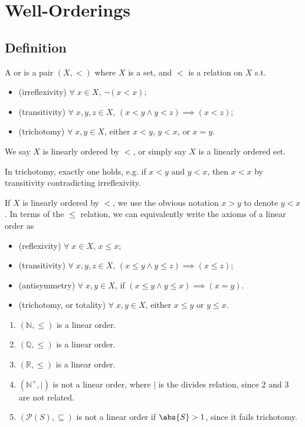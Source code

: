 \section{Well-Orderings}
\subsection{Definition}

\begin{definition}
    A  or  is a pair $(X, <)$ where $X$ is a set, and $<$ is a relation on $X$ s.t.
    \begin{itemize}
        \item (irreflexivity) $\forall \; x \in X$, $\neg(x < x)$;
        \item (transitivity) $\forall \; x, y, z \in X$, $(x < y \wedge y < z) \implies (x < z)$;
        \item (trichotomy) $\forall \; x, y \in X$, either $x < y$, $y < x$, or $x = y$.
    \end{itemize}
    We say $X$ is linearly ordered by $<$, or simply say $X$ is a linearly ordered set.
\end{definition}

\begin{note}
    In trichotomy, exactly one holds, e.g. if $x < y$ and $y < x$, then $x < x$ by transitivity contradicting irreflexivity.
\end{note}

If $X$ is linearly ordered by $<$, we use the obvious notation $x > y$ to denote $y < x$.
In terms of the $\leq$ relation, we can equivalently write the axioms of a linear order as
\begin{itemize}
    \item (reflexivity) $\forall \; x \in X$, $x \leq x$;
    \item (transitivity) $\forall \; x, y, z \in X$, $(x \leq y \wedge y \leq z) \implies (x \leq z)$;
    \item (antisymmetry) $\forall \; x, y \in X$, if $(x \leq y \wedge y \leq x) \implies (x = y)$.
    \item (trichotomy, or totality) $\forall \; x, y \in X$, either $x \leq y$ or $y \leq x$.
\end{itemize}

\begin{example}
    \begin{enumerate}
        \item $(\mathbb N, \leq)$ is a linear order.
        \item $(\mathbb Q, \leq)$ is a linear order.
        \item $(\mathbb R, \leq)$ is a linear order.
        \item $(\mathbb N^+, |)$ is not a linear order, where $|$ is the divides relation, since $2$ and $3$ are not related.
        \item $(\mathcal P(S), \subseteq)$ is not a linear order if $\abs{S} > 1$, since it fails trichotomy.
    \end{enumerate}
\end{example}

